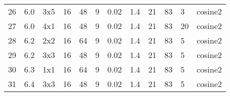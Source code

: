 \begin{center}
\begin{tabular}{l | c | l | l l l l l l l l | l}
        26  & 6.0    & 3x5       & 16    & 48       & 9      & 0.02             & 1.4                  & 21               & 83    & 3   & cosine2 \\ 
        27  & 6.0    & 4x1       & 16    & 48       & 9      & 0.02             & 1.4                  & 21               & 83    & 20  & cosine2 \\ 
        28  & 6.2    & 2x2       & 16    & 64       & 9      & 0.02             & 1.4                  & 21               & 83    & 5   & cosine2 \\ 
        29  & 6.2    & 3x3       & 16    & 48       & 9      & 0.02             & 1.4                  & 21               & 83    & 5   & cosine2 \\ 
        30  & 6.3    & 1x1       & 16    & 64       & 9      & 0.02             & 1.4                  & 21               & 83    & 5   & cosine2 \\ 
        31  & 6.4    & 3x3       & 16    & 48       & 9      & 0.02             & 1.4                  & 21               & 83    & 5   & cosine2 \\ 
    \end{tabular}
    \label{tab:parametersSet}
\end{center}

\newpage

